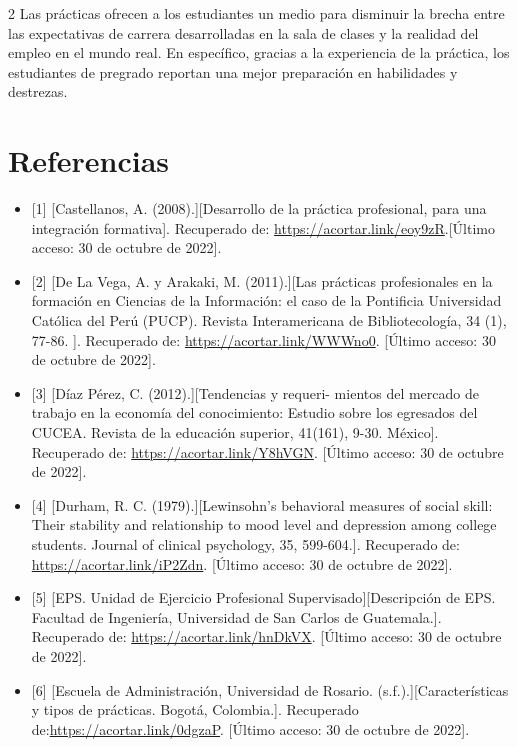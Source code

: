 \documentclass[12pt,spanish,Letterpaper,openany]{book}
\begin{document}
\begin {multicols}{2}
Las prácticas ofrecen a los estudiantes un medio para disminuir la brecha entre las expectativas de carrera desarrolladas en la sala de clases y la realidad del empleo en el mundo real. En específico, gracias a la experiencia de la práctica, los estudiantes de pregrado reportan una mejor preparación en habilidades y destrezas.

\hypertarget{referencias-8}{%
\section{Referencias}\label{referencias-8}}

\begin{itemize}
\item
  {[}1{]} {[}Castellanos, A. (2008).{]}{[}Desarrollo de la práctica profesional, para una integración formativa{]}. Recuperado de: \url{https://acortar.link/eoy9zR}.{[}Último acceso: 30 de octubre de 2022{]}.
\item
  {[}2{]} {[}De La Vega, A. y Arakaki, M. (2011).{]}{[}Las prácticas profesionales en la formación en Ciencias de la Información: el caso de la Pontificia Universidad Católica del Perú (PUCP). Revista Interamericana de Bibliotecología, 34 (1), 77-86. {]}. Recuperado de: \url{https://acortar.link/WWWno0}. {[}Último acceso: 30 de octubre de 2022{]}.
\item
  {[}3{]} {[}Díaz Pérez, C. (2012).{]}{[}Tendencias y requeri-
  mientos del mercado de trabajo en la economía del conocimiento: Estudio sobre los egresados del CUCEA. Revista de la educación superior, 41(161), 9-30. México{]}. Recuperado de: \url{https://acortar.link/Y8hVGN}. {[}Último acceso: 30 de octubre de 2022{]}.
\item
  {[}4{]} {[}Durham, R. C. (1979).{]}{[}Lewinsohn's behavioral measures of social skill: Their stability and relationship to mood level and depression among college students. Journal of clinical psychology, 35, 599-604.{]}. Recuperado de: \url{https://acortar.link/iP2Zdn}. {[}Último acceso: 30 de octubre de 2022{]}.
\item
  {[}5{]} {[}EPS. Unidad de Ejercicio Profesional Supervisado{]}{[}Descripción de EPS. Facultad de Ingeniería, Universidad de San Carlos de Guatemala.{]}. Recuperado de: \url{https://acortar.link/hnDkVX}. {[}Último acceso: 30 de octubre de 2022{]}.
\item
  {[}6{]} {[}Escuela de Administración, Universidad de Rosario. (s.f.).{]}{[}Características y tipos de prácticas. Bogotá, Colombia.{]}. Recuperado de:\url{https://acortar.link/0dgzaP}. {[}Último acceso: 30 de octubre de 2022{]}.

\end{itemize}
\end{multicols}
\end{document}

